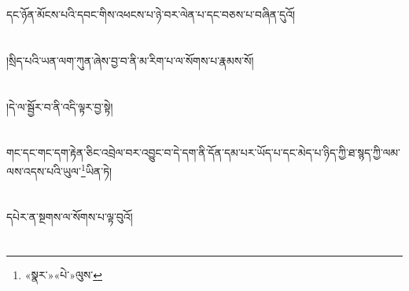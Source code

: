 དང་ཉོན་མོངས་པའི་དབང་གིས་འཕངས་པ་ཉེ་བར་ལེན་པ་དང་བཅས་པ་བཞིན་དུའོ།\chapter{ }།སྲིད་པའི་ཡན་ལག་ཀུན་ཞེས་བྱ་བ་ནི་མ་རིག་པ་ལ་སོགས་པ་རྣམས་སོ།\chapter{ }།དེ་ལ་སྦྱོར་བ་ནི་འདི་ལྟར་བྱ་སྟེ།\chapter{ }གང་དང་གང་དག་རྟེན་ཅིང་འབྲེལ་བར་འབྱུང་བ་དེ་དག་ནི་དོན་དམ་པར་ཡོད་པ་དང་མེད་པ་ཉིད་ཀྱི་ཐ་སྙད་ཀྱི་ལམ་ལས་འདས་པའི་ཡུལ་\footnote{«སྣར་»«པེ་»ལུས་}ཡིན་ཏེ།\chapter{ }དཔེར་ན་སྔགས་ལ་སོགས་པ་ལྟ་བུའོ།\chapter{ }